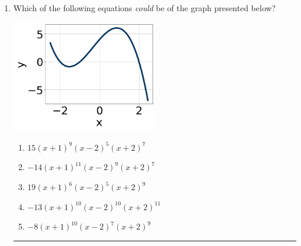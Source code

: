 \documentclass[14pt]{extbook}
\newcommand{\litem}[1]{\item#1\hspace*{-1cm}\rule{\textwidth}{0.4pt}}
\begin{document}
\begin{enumerate}
{\begin{enumerate}[label=\Alph*.]
\end{enumerate} }
\litem{
Which of the following equations \textit{could} be of the graph presented below?
\begin{center}
    \includegraphics[width=0.5\textwidth]{../Figures/polyGraphToFunctionA.png}
\end{center}
\begin{enumerate}[label=\Alph*.]
\item \( 15(x + 1)^{9} (x - 2)^{5} (x + 2)^{7} \)
\item \( -14(x + 1)^{11} (x - 2)^{9} (x + 2)^{7} \)
\item \( 19(x + 1)^{6} (x - 2)^{5} (x + 2)^{9} \)
\item \( -13(x + 1)^{10} (x - 2)^{10} (x + 2)^{11} \)
\item \( -8(x + 1)^{10} (x - 2)^{7} (x + 2)^{9} \)


\end{enumerate}}
\end{enumerate}
\end{document}
